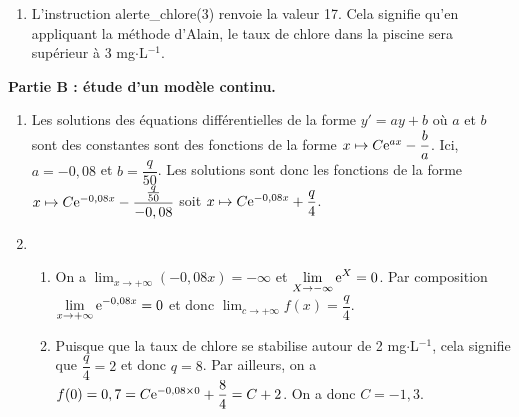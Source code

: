 \documentclass[11pt,fleqn, openany]{book} %
\begin{document}
\begin{solution}
\begin{enumerate}


\item L'instruction alerte\_chlore(3) renvoie la valeur 17. Cela signifie qu'en appliquant la méthode d'Alain, le taux de chlore dans la piscine sera supérieur à 3 mg$\cdot$L$^{-1}$.

\end{enumerate}


\textbf{Partie B : étude d'un modèle continu.}

\begin{enumerate}
\item Les solutions des équations différentielles de la forme $y'=ay+b$ où $a$ et $b$ sont des constantes sont des fonctions de la forme $x\mapsto C\mathrm{e}^{ax}-\dfrac{b}{a}$. Ici, $a=-0,08$ et $b=\dfrac{q}{50}$. Les solutions sont donc les fonctions de la forme $x\mapsto C\mathrm{e}^{-0,08x} - \dfrac{\frac{q}{50}}{-0,08}$ soit $x\mapsto C\mathrm{e}^{-0,08x}+\dfrac{q}{4}$.
\item \begin{enumerate}
\item On a $\displaystyle\lim_{x\to +\infty}(-0,08x)=-\infty$ et $\displaystyle\lim_{X\to -\infty}\mathrm{e}^X = 0$. Par composition $\displaystyle\lim_{x\to + \infty}\mathrm{e}^{-0,08x}=0$ et donc $\displaystyle\lim_{c\to +\infty}f(x)=\dfrac{q}{4}$.
\item Puisque que la taux de chlore se stabilise autour de 2 mg$\cdot$L$^{-1}$, cela signifie que $\dfrac{q}{4}=2$ et donc $q=8$. Par ailleurs, on a $f(0)=0,7=C\mathrm{e}^{-0,08 \times 0}+\dfrac{8}{4}=C+2$. On a donc $C=-1,3$.
\end{enumerate}
\end{enumerate}

\end{solution}
\end{document}
